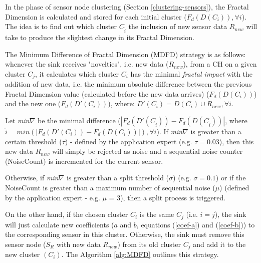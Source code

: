 \documentclass{acm_proc_article-sp}
\begin{document}
In the phase of sensor node clustering (Section \ref{clustering-sensors}), the
Fractal Dimension is calculated and stored for each initial cluster
($F_{d}(D(C_i)), \forall i$). The idea is to find out which cluster
$C_{\hat{i}}$ the inclusion of new sensor data $R_{new}$ will take to produce
the slightest change in its Fractal Dimension.


The Minimum Difference of Fractal Dimension (MDFD) strategy is as follows:
whenever the sink receives "novelties", i.e. new data ($R_{new}$), from a CH on
a given cluster $C_j$, it calculates which cluster $C_i$ has the minimal
\textit{fractal impact} with the addition of new data, i.e. the minimum absolute
difference between the previous Fractal Dimension value (calculated before the
new data arrives) ($F_d(D(C_i))$) and the new one ($F_d(D'(C_i))$), where:
$D'(C_i) = D(C_i) \cup R_{new}, \forall i$.

Let {\it min}$\nabla$ be the minimal difference ($|F_d(D'(C_{\hat{i}})) -
F_d(D(C_{\hat{i}}))|$, where $\hat{i} = min(|F_d(D'(C_i)) - F_d(D(C_i))|),
\forall i$). If {\it min}$\nabla$ is greater than a certain threshold ($\tau$) -
defined by the application expert (e.g. $\tau = 0.03$), then this new data
$R_{new}$ will simply be rejected as noise and a sequential noise counter
(NoiseCount) is incremented for the current sensor.

Otherwise, if {\it min}$\nabla$ is greater than a split threshold ($\sigma$)
(e.g. $\sigma = 0.1$) or if the NoiseCount is greater than a maximum number of
sequential noise ($\mu$) (defined by the application expert - e.g. $\mu$ = 3),
then a split process is triggered.

On the other hand, if the chosen cluster $C_i$ is the same $C_j$ (i.e.
$i=j$), the sink will just calculate new coefficients ($a$ and $b$, equations
(\ref{coef-a}) and (\ref{coef-b})) to the corresponding sensor in this cluster.
Otherwise, the sink must remove this sensor node ($S_{R}$ with new data
$R_{new}$) from its old cluster $C_j$ and add it to the new cluster $(C_i)$.
The Algorithm \ref{alg:MDFD} outlines this strategy.
\end{document}
